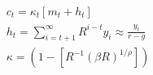 \begin{align}
	c_t = \kappa_t[m_t + h_t]\\
	h_t = \sum_{i=t+1}^{\infty}R^{i-t}y_{i} \approx \frac{y_t}{r - g}\\
	\kappa = {(1 - {[R^{-1}(\beta R)^{1/\rho}]})}
\end{align}
